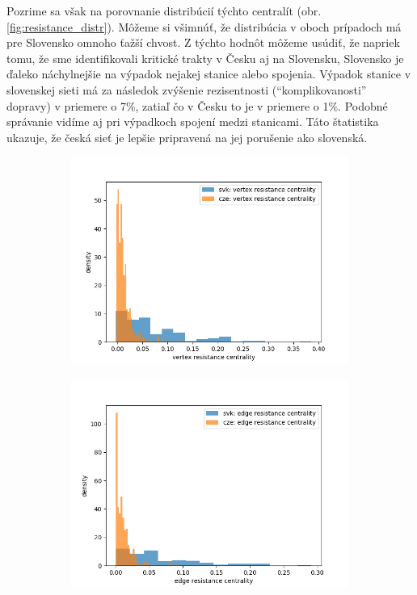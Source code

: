 \documentclass[main.tex]{subfiles}
\begin{document}
Pozrime sa však na porovnanie distribúcií týchto centralít (obr. \ref{fig:resistance_distr}). Môžeme si všimnúť, že distribúcia v oboch prípadoch má pre Slovensko omnoho ťažší chvost. Z týchto hodnôt môžeme usúdiť, že napriek tomu, že sme identifikovali kritické trakty v Česku aj na Slovensku, Slovensko je ďaleko náchylnejšie na výpadok nejakej stanice alebo spojenia. Výpadok stanice v slovenskej sieti má za následok zvýšenie rezisentnosti (\enquote{komplikovanosti} dopravy) v priemere o 7\%, zatiaľ čo v Česku to je v priemere o 1\%. Podobné správanie vidíme aj pri výpadkoch spojení medzi stanicami. Táto štatistika ukazuje, že česká sieť je lepšie pripravená na jej porušenie ako slovenská.

\begin{figure}
	\centering
	
	\begin{subfigure}{\linewidth}
		\centering
		\includegraphics[width=1\textwidth]{images/vertex_resistance_distribution.png}
	\end{subfigure}
	
	\vspace{0.5cm}
	
	\begin{subfigure}{\linewidth}
		\centering
		\includegraphics[width=1\textwidth]{images/edge_resistance_distribution.png}
	\end{subfigure}
	

\end{figure}
\end{document}
